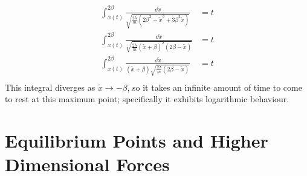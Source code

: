 \documentclass{article}
\begin{document}
\begin{align*}
	\int_{x(t)}^{2\beta} \frac{\dd \widetilde x}{\sqrt{\frac{2\lambda}{m}(2\beta^3 - \widetilde x^3 + 3 \beta^2 \widetilde x)}} & = t \\
	\int_{x(t)}^{2\beta} \frac{\dd \widetilde x}{\sqrt{\frac{2\lambda}{m}(\widetilde x + \beta)^2(2\beta - \widetilde x)}}      & = t \\
	\int_{x(t)}^{2\beta} \frac{\dd \widetilde x}{(\widetilde x + \beta)\sqrt{\frac{2\lambda}{m}(2\beta - \widetilde x)}}        & = t \\
\end{align*}
This integral diverges as $\widetilde x \to -\beta$, so it takes an infinite amount of time to come to rest at this maximum point; specifically it exhibits logarithmic behaviour.

\section{Equilibrium Points and Higher Dimensional Forces}
\end{document}
